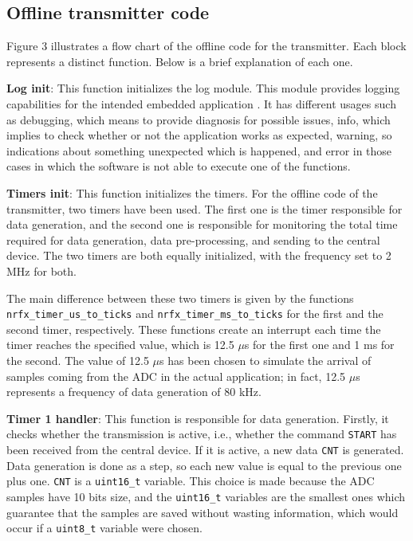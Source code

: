\documentclass{Configuration_Files/PoliMi3i_thesis}
\begin{document}
\subsection{Offline transmitter code}
Figure 3 illustrates a flow chart of the offline code for the transmitter. Each block represents a distinct function. Below is a brief explanation of each one.


\textbf{Log init}: \quad This function initializes the log module. This module provides logging capabilities for the intended embedded application \cite{NordicSemiconductorInfocentera}. It has different usages such as debugging, which means to provide diagnosis for possible issues, info, which implies to check whether or not the application works as expected, warning, so indications about something unexpected which is happened, and error in those cases in which the software is not able to execute one of the functions.

\textbf{Timers init}: \quad This function initializes the timers. For the offline code of the transmitter, two timers have been used. The first one is the timer responsible for data generation, and the second one is responsible for monitoring the total time required for data generation, data pre-processing, and sending to the central device. The two timers are both equally initialized, with the frequency set to 2 MHz for both.

The main difference between these two timers is given by the functions \texttt{nrfx\_timer\_us\_to\_ticks} and \texttt{nrfx\_timer\_ms\_to\_ticks} for the first and the second timer, respectively. These functions create an interrupt each time the timer reaches the specified value, which is 12.5 $\mu$s for the first one and 1 ms for the second. The value of 12.5 $\mu$s has been chosen to simulate the arrival of samples coming from the ADC in the actual application; in fact, 12.5 $\mu$s represents a frequency of data generation of 80 kHz.

\textbf{Timer 1 handler}: \quad This function is responsible for data generation. Firstly, it checks whether the transmission is active, i.e., whether the command \texttt{START} has been received from the central device. If it is active, a new data \texttt{CNT} is generated. Data generation is done as a step, so each new value is equal to the previous one plus one. \texttt{CNT} is a \texttt{uint16\_t} variable. This choice is made because the ADC samples have 10 bits size, and the \texttt{uint16\_t} variables are the smallest ones which guarantee that the samples are saved without wasting information, which would occur if a \texttt{uint8\_t} variable were chosen.
\end{document}

